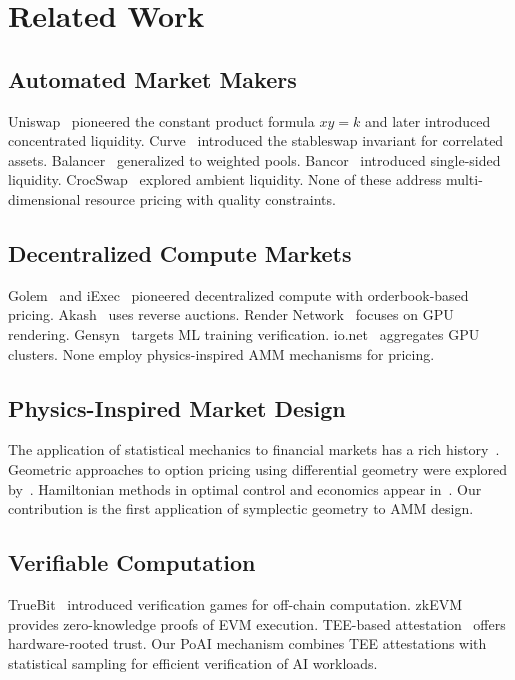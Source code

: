 \section{Related Work}

\label{sec:related}

\subsection{Automated Market Makers}

Uniswap~\cite{adams2020uniswap,adams2021uniswapv3} pioneered the constant product formula $xy = k$ and later introduced concentrated liquidity. Curve~\cite{egorov2019stableswap} introduced the stableswap invariant for correlated assets. Balancer~\cite{martinelli2019balancer} generalized to weighted pools. Bancor~\cite{hertzog2017bancor} introduced single-sided liquidity. CrocSwap~\cite{crocswap2023} explored ambient liquidity. None of these address multi-dimensional resource pricing with quality constraints.

\subsection{Decentralized Compute Markets}

Golem~\cite{golem2016} and iExec~\cite{iexec2018} pioneered decentralized compute with orderbook-based pricing. Akash~\cite{akash2020} uses reverse auctions. Render Network~\cite{rendernetwork2021} focuses on GPU rendering. Gensyn~\cite{gensyn2023} targets ML training verification. io.net~\cite{ionet2024} aggregates GPU clusters. None employ physics-inspired AMM mechanisms for pricing.

\subsection{Physics-Inspired Market Design}

The application of statistical mechanics to financial markets has a rich history~\cite{mantegna2000introduction,bouchaud2003theory}. Geometric approaches to option pricing using differential geometry were explored by~\cite{ilinski2001physics}. Hamiltonian methods in optimal control and economics appear in~\cite{sethi2019optimal}. Our contribution is the first application of symplectic geometry to AMM design.

\subsection{Verifiable Computation}

TrueBit~\cite{teutsch2019truebit} introduced verification games for off-chain computation. zkEVM~\cite{zkevm2023} provides zero-knowledge proofs of EVM execution. TEE-based attestation~\cite{costan2016intel} offers hardware-rooted trust. Our PoAI mechanism combines TEE attestations with statistical sampling for efficient verification of AI workloads.

